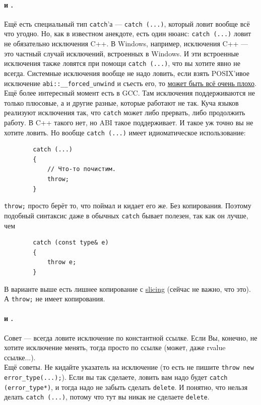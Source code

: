 \documentclass{article}
\begin{document}
    \paragraph{ и .}
    Ещё есть специальный тип \texttt{catch}'а --- \texttt{catch (...)}, который ловит вообще всё что угодно. Но, как в известном анекдоте, есть один нюанс: \texttt{catch (...)} ловит не обязательно исключения C++. В Windows, например, исключения C++ --- это частный случай исключений, встроенных в Windows. И эти встроенные исключения также ловятся при помощи \texttt{catch (...)}, что вы хотите явно не всегда. Системные исключения вообще не надо ловить, если взять POSIX'ивое исключение \texttt{abi::__forced_unwind} и съесть его, то \href{https://udrepper.livejournal.com/21541.html}{может быть всё очень плохо}. Ещё более интересный момент есть в GCC. Там исключения поддерживаются не только плюсовые, а и другие разные, которые работают не так. Куча языков реализуют исключения так, что \texttt{catch} может либо прервать, либо продолжить работу. В C++ такого нет, но ABI такое поддерживает. И такое уж точно вы не хотите ловить. Но вообще \texttt{catch (...)} имеет идиоматическое использование:
    \begin{verbatim}
        catch (...)
        {
            // Что-то почистим.
            throw;
        }
    \end{verbatim}
    \texttt{throw;} просто берёт то, что поймал и кидает его же. Без копирования. Поэтому подобный синтаксис даже в обычных \texttt{catch} бывает полезен, так как он лучше, чем
    \begin{verbatim}
        catch (const type& e)
        {
            throw e;
        }
    \end{verbatim}
    В варианте выше есть лишнее копирование с \hyperref[par:slicing]{slicing} (сейчас не важно, что это). А \texttt{throw;}  не имеет копирования.
    \paragraph{ и .}
    Совет --- всегда ловите исключение по константной ссылке. Если Вы, конечно, не хотите исключение менять, тогда просто по ссылке (может, даже rvalue ссылке...).\\
    Ещё советы. Не кидайте указатель на исключение (то есть не пишите \texttt{throw new error_type(...);}). Если вы так сделаете, ловить вам надо будет \texttt{catch (error_type*)}, и тогда надо не забыть сделать \texttt{delete}. И понятно, что нельзя делать \texttt{catch (...)}, потому что тут вы никак не сделаете \texttt{delete}.
\end{document}
